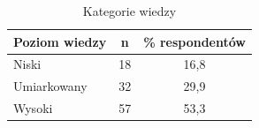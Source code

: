 



\begin{table}[H]
    \centering
    \caption{Kategorie wiedzy}
    \label{tab:kategorie-wiedzy}
    \begin{tabular}{|l|c|c|}
        \hline
        \textbf{Poziom wiedzy} & \textbf{n} & \textbf{\% respondentów} \\
        \hline
        \hline
        Niski & 18 & 16,8 \\
        \hline
        Umiarkowany & 32 & 29,9 \\
        \hline
        Wysoki & 57 & 53,3 \\
        \hline
    \end{tabular}
\end{table}




